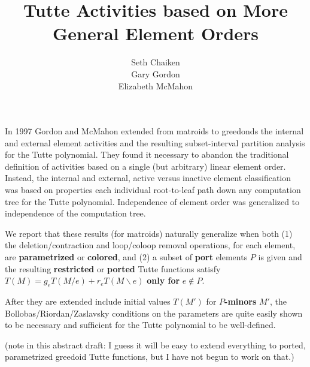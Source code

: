 \documentclass{article}
\title{Tutte Activities based on More General Element Orders}
\author{Seth Chaiken\\
Gary Gordon\\
Elizabeth McMahon}
\begin{document}
\maketitle
In 1997 Gordon and McMahon\cite{GordonMcMachonGreedoid} 
extended from matroids to greedonds
the internal and external 
element activities and the resulting subset-interval 
partition analysis for the Tutte polynomial.  They found it necessary
to abandon the traditional definition of activities based on a 
single (but arbitrary) linear element order.  Instead, the internal and 
external, active versus inactive element classification was based on 
properties each individual root-to-leaf path down any computation tree
for the Tutte polynomial.  Independence of element order was generalized to
independence of the computation tree.

We report that these results (for matroids) naturally generalize when both (1) 
the deletion/contraction and loop/coloop removal operations, for each element,
are \textbf{parametrized} or 
\textbf{colored}, and (2) a subset of \textbf{port} elements 
$P$ is given and the resulting \textbf{restricted} or \textbf{ported}
Tutte functions satisfy $T(M) = g_e T(M/e) + r_e T(M\backslash e)$ 
\textbf{only for} $e\not\in P$.

After they are extended include initial values $T(M')$ for 
\textbf{$P$-minors} $M'$, the Bollobas/Riordan/Zaslavsky 
conditions on the parameters are quite easily 
shown to be necessary and sufficient for the Tutte polynomial to be
well-defined.

(note in this abstract draft: I guess it will be easy to extend everything
to ported, parametrized greedoid Tutte functions, but I have not 
begun to work on that.)




\end{document}

